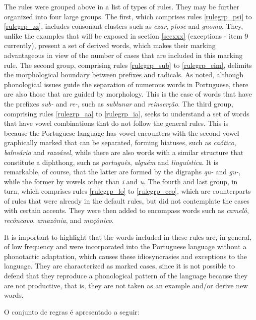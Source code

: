 \documentclass{article}
\begin{document}
The \NumberOfNewRules{} rules were grouped above in a list of
 types of rules. They may be further organized into four
large groups. The first, which comprises rules \ref{rulegrp_psi} to
\ref{rulegrp_zz}, includes consonant clusters such as \emph{czar}, \emph{ptose}
and \emph{gnomo}. They, unlike the examples that will be exposed in section
\ref{secxxx} (exceptions - item 9 currently), present a set of derived words,
which makes their marking advantageous in view of the number of cases that are
included in this marking rule. The second group, comprising rules
\ref{rulegrp_sub} to \ref{rulegrp_eim}, delimits the morphological boundary
between prefixes and radicals. As noted, although phonological issues guide the
separation of numerous words in Portuguese, there are also those that are
guided by morphology. This is the case of words that have the prefixes
\emph{sub-} and \emph{re-}, such as \emph{sublunar} and \emph{reinserção}. The
third group, comprising rules \ref{rulegrp_aa} to \ref{rulegrp_ia}, seeks to
understand a set of words that have vowel combinations that do not follow the
general rules. This is because the Portuguese language has vowel encounters
with the second vowel graphically marked that can be separated, forming
hiatuses, such as \emph{caótico}, \emph{balneário} and \emph{razoável}, while
there are also words with a similar structure that constitute a diphthong, such
as \emph{português}, \emph{alguém} and \emph{linguística}. It is remarkable, of
course, that the latter are formed by the digraphs \emph{qu-} and \emph{gu-},
while the former by vowels other than \emph{i} and \emph{u}. The fourth and
last group, in turn, which comprises rules \ref{rulegrp_lo} to
\ref{rulegrp_cco}, which are counterparts of rules that were already in the
default rules, but did not contemplate the cases with certain accents. They
were then added to encompass words such as \emph{camelô}, \emph{recôncavo},
\emph{amazônia}, and \emph{maçônico}.

It is important to highlight that the words included in these rules are, in general, of low frequency and were incorporated into the Portuguese language without a phonotactic adaptation, which causes these idiosyncrasies and exceptions to the language. They are characterized as marked cases, since it is not possible to defend that they reproduce a phonological pattern of the language because they are not productive, that is, they are not taken as an example and/or derive new words.


O conjunto de \NumberOfNewRules{} regras é apresentado a seguir:
\begin{multicols}{6}
    \footnotesize
    
\end{multicols}
\end{document}
